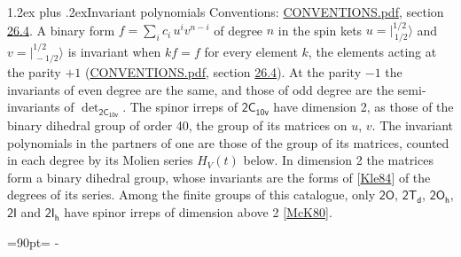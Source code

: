 \documentclass[10pt,a4paper]{article}
\makeatletter
\renewcommand\section{\@startsection{section}{1}{\z@}{-3ex plus -1ex minus -.2ex}%
  {1.2ex plus .2ex}{\normalfont\large\sffamily\bfseries\color{parttitle}}}
\newcommand{\needspace}[1]{\par\penalty-100\begingroup\dimen0=#1\relax\dimen2=\pagegoal
  \advance\dimen2-\pagetotal\ifdim\dimen0>\dimen2\relax\ifdim\dimen2>0pt\vfil\break\fi\fi
  \endgroup}
\numberwithin{equation}{section}
\newcommand{\grp}[1]{\mathsf{#1}}
\newcommand{\jm}[2]{\bigl\lvert{}^{#1}_{\,#2}\bigr\rangle}
\makeatother
\begin{document}
\section{Invariant polynomials}\label{s:invariants}
Conventions: \href{../../CONVENTIONS.pdf}{CONVENTIONS.pdf}, section \href{../../CONVENTIONS.pdf\#conv.26.4}{26.4}.
\leavevmode\label{n:local.binary.form}A binary form $f = \sum_i c_i\, u^i v^{n-i}$ of degree $n$ in the spin kets $u = \jm{1/2}{1/2}$ and $v = \jm{1/2}{-1/2}$ is invariant when $k f = f$ for every element $k$, the elements acting at the parity $+1$ (\href{../../CONVENTIONS.pdf}{CONVENTIONS.pdf}, section \href{../../CONVENTIONS.pdf\#conv.26.4}{26.4}). At the parity $-1$ the invariants of even degree are the same, and those of odd degree are the semi-invariants of $\det_{\grp{2C_{10v}}}$.
The spinor irreps of $\grp{2C_{10v}}$ have dimension 2, as those of the binary dihedral group of order 40, the group of its matrices on $u$, $v$. \label{n:function.hilbert}The invariant polynomials in the partners of one are those of the group of its matrices, counted in each degree by its Molien series $H_V(t)$ below. In dimension 2 the matrices form a binary dihedral group, whose invariants are the forms of [\href{../../../REFERENCES.pdf\#ref.Kle84}{Kle84}] of the degrees of its series. Among the finite groups of this catalogue, only $\grp{2O}$, $\grp{2T_{d}}$, $\grp{2O_{h}}$, $\grp{2I}$ and $\grp{2I_{h}}$ have spinor irreps of dimension above 2 [\href{../../../REFERENCES.pdf\#ref.McK80}{McK80}].
\needspace{90pt}
\end{document}
